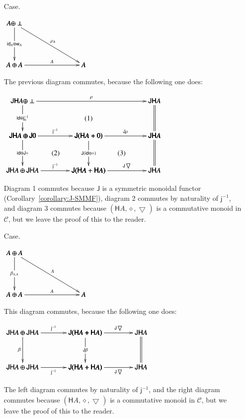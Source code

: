 \documentclass{lmcs}
\let\c\relax
\let\wn\relax
\newcommand{\cat}[1]{\mathcal{#1}}
\newcommand{\func}[1]{\mathsf{#1}}
\newcommand{\id}[0]{\mathsf{id}}
\newcommand{\w}[1]{\mathsf{w}_{#1}}
\newcommand{\c}[1]{\mathsf{c}_{#1}}
\newcommand{\jinv}[1]{\mathsf{j}^{-1}_{#1}}
\newcommand{\wn}[0]{\mathop{?}}
\newcommand{\codiag}[1]{\bigtriangledown_{#1}}
\newenvironment{diagram}{
  \begin{center}
    \begin{math}
      \bfig
}{
      \efig
    \end{math}
  \end{center}
}
\begin{document}
\begin{itemize}
\item[Case.]\ \\
  \begin{diagram}
    \btriangle|maa|/->`->`->/<1000,600>[
      \wn A \oplus \perp`
      \wn A \oplus \wn A`
      \wn A;
      \id_{\wn A} \oplus \w{A}`
      \rho_{\wn A}`
      \c{A}]
  \end{diagram}
  The previous diagram commutes, because the following one does:
  \begin{diagram}
    \square|amma|/->`->`->`->/<950,500>[
      \func{JH}A \oplus \func{J}0`
      \func{J}(\func{H}A + 0)`
      \func{JH}A \oplus \func{JH}A`
      \func{J}(\func{H}A + \func{H}A);
      \jinv{}`
      \id \oplus \func{J}\diamond`
      \func{J}(\id \oplus \diamond)`
      \jinv{}]

    \square(950,0)|amma|/->``=`->/<950,500>[
      \func{J}(\func{H}A + 0)`
      \func{JH}A`
      \func{J}(\func{H}A + \func{H}A)`
      \func{JH}A;
      \func{J}\rho```
      \func{J}\codiag{}]

    \square(0,500)|amma|/->`->`=`/<1900,500>[
      \func{JH}A \oplus \perp`
      \func{JH}A`
      \func{JH}A \oplus \func{J}0`
      \func{JH}A;
      \rho`
      \id \oplus \jinv{0}``]

    \place(950,750)[(1)]
    \place(475,250)[(2)]
    \place(1425,250)[(3)]      
  \end{diagram}
  Diagram 1 commutes because $\func{J}$ is a symmetric monoidal
  functor (Corollary~\ref{corollary:J-SMMF}), diagram 2 commutes by
  naturality of $\jinv{}$, and diagram 3 commutes because
  $(\func{H}A, \diamond, \codiag{})$ is a commutative monoid in
  $\cat{C}$, but we leave the proof of this to the reader.
  
\item[Case.]\ \\
  \begin{diagram}
    \btriangle|maa|/->`->`->/<1000,600>[
      \wn A \oplus \wn A`
      \wn A \oplus \wn A`
      \wn A;
      \beta_{\wn A,\wn A}`
      \c{A}`
      \c{A}]
  \end{diagram}
  This diagram commutes, because the following one does:
  \begin{diagram}
    \hSquares/->`->`->`->`=`->`->/[
      \func{JH}A \oplus \func{JH}A`
      \func{J}(\func{H}A + \func{H}A)`
      \func{JH}A`
      \func{JH}A \oplus \func{JH}A`
      \func{J}(\func{H}A + \func{H}A)`
      \func{JH}A;
      \jinv{}`
      \func{J}\codiag{}`
      \beta`
      \func{J}\beta``
      \jinv{}`
      \func{J}\codiag{}]
  \end{diagram}
  The left diagram commutes by naturality of $\jinv{}$, and the right
  diagram commutes because $(\func{H}A, \diamond, \codiag{})$ is a
  commutative monoid in $\cat{C}$, but we leave the proof of this to
  the reader.
\end{itemize}
\end{document}
